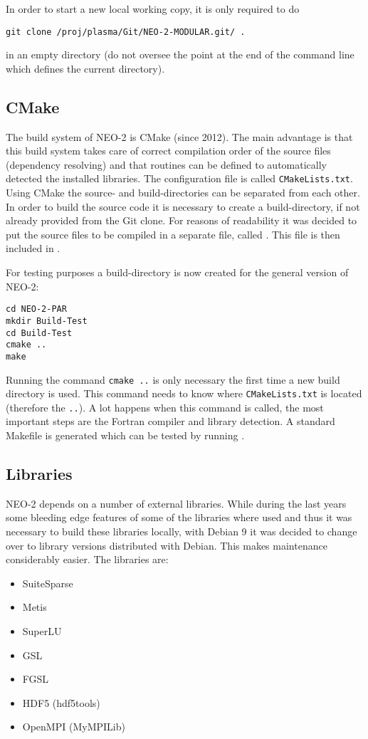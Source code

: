 \documentclass{article}
\newcommand{\vv}[1]{\texttt{\detokenize{#1}}}
\begin{document}
In order to start a new local working copy, it is only required to do
\begin{verbatim}
git clone /proj/plasma/Git/NEO-2-MODULAR.git/ .
\end{verbatim}
in an empty directory (do not oversee the point at the end of the command line which defines the current directory).

\subsection{CMake}
The build system of NEO-2 is CMake (since 2012). The main advantage is that this build system takes care of correct compilation order of the source files (dependency resolving) and that routines can be defined to automatically detected the installed libraries. The configuration file is called \verb|CMakeLists.txt|. Using CMake the source- and build-directories can be separated from each other. In order to build the source code it is necessary to create a build-directory, if not already provided from the Git clone. For reasons of readability it was decided to put the source files to be compiled in a separate file, called \vv{CMakeSources.in}. This file is then included in \vv{CMakeLists.txt}.

For testing purposes a build-directory is now created for the general version of NEO-2:
\begin{verbatim}
cd NEO-2-PAR
mkdir Build-Test
cd Build-Test
cmake ..
make
\end{verbatim}

Running the command \verb|cmake ..| is only necessary the first time a new build directory is used. This command needs to know where \verb|CMakeLists.txt| is located (therefore the \verb|..|). A lot happens when this command is called, the most important steps are the Fortran compiler and library detection. A standard Makefile is generated which can be tested by running \vv{make}. 

\subsection{Libraries}
NEO-2 depends on a number of external libraries. While during the last years some bleeding edge features of some of the libraries where used and thus it was necessary to build these libraries locally, with Debian 9 it was decided to change over to library versions distributed with Debian. This makes maintenance considerably easier. The libraries are:
\begin{itemize}
\item SuiteSparse
\item Metis
\item SuperLU
\item GSL
\item FGSL
\item HDF5 (hdf5tools)
\item OpenMPI (MyMPILib)
\end{itemize}
\end{document}
